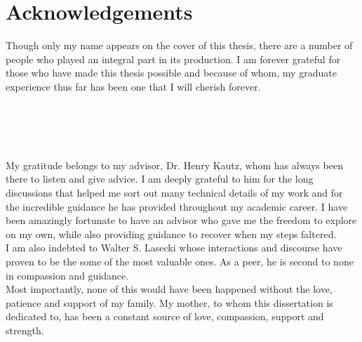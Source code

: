 \newpage                                             \chapter{Acknowledgements}

Though only my name appears on the cover of this thesis, there are a number of
people who played an integral part in its production. I am forever grateful for
those  who have made this thesis possible and because of whom, my graduate
experience thus far has been one that I will cherish forever.\\\\\\\\\


My gratitude belongs to my advisor, Dr. Henry Kautz, whom has always been there
to listen and give advice. I am deeply grateful to him for the long 
discussions that helped me sort out many technical details of my work and for 
the incredible guidance he has provided throughout my academic career. I have 
been amazingly fortunate to have an advisor who gave me the freedom to explore
on my own, while also providing guidance to recover when my steps faltered.\\


I am also indebted to Walter S. Lasecki whose interactions and discourse have
proven to be the some of the most valuable ones.  As a peer, he is second to
none in compassion and guidance.\\

Most importantly, none of this would have been happened without the love,
patience and support of my family. My mother, to whom this dissertation is
dedicated to, has been a constant source of love, compassion, support and
strength.
